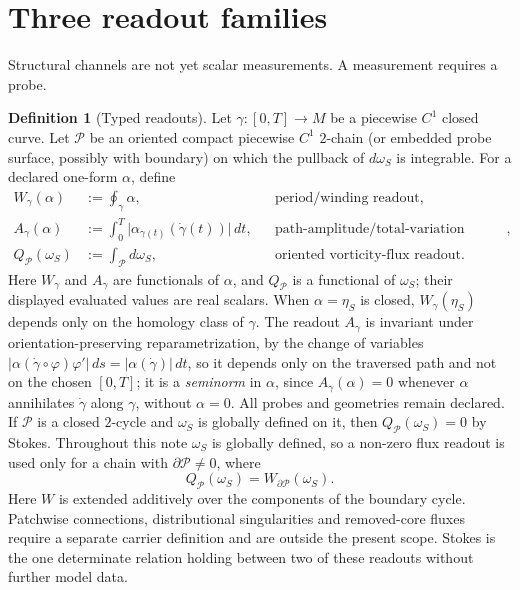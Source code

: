 \documentclass[11pt]{article}
\theoremstyle{definition}
\newtheorem{definition}[theorem]{Definition}
\begin{document}
\section{Three readout families}

Structural channels are not yet scalar measurements.  A measurement
requires a probe.

\begin{definition}[Typed readouts]\label{def:readouts}
Let \(\gamma:[0,T]\to M\) be a piecewise \(C^1\) closed curve.  Let
\(\mathcal P\) be an oriented compact piecewise \(C^1\) \(2\)-chain
(or embedded probe surface, possibly with boundary) on which the
pullback of \(d\omega_S\) is integrable.  For a declared one-form
\(\alpha\), define
\begin{align}
W_\gamma(\alpha)
  &:=\oint_\gamma\alpha,
  &&\text{period/winding readout},\label{eq:period}\\
A_\gamma(\alpha)
  &:=\int_0^T
       \bigl|\alpha_{\gamma(t)}(\dot\gamma(t))\bigr|\,dt,
  &&\text{path-amplitude/total-variation readout},\label{eq:norm}\\
Q_{\mathcal P}(\omega_S)
  &:=\int_{\mathcal P}d\omega_S,
  &&\text{oriented vorticity-flux readout}.\label{eq:flux}
\end{align}
Here \(W_\gamma\) and \(A_\gamma\) are functionals of \(\alpha\), and
\(Q_{\mathcal P}\) is a functional of \(\omega_S\); their displayed
evaluated values are real scalars.  When \(\alpha=\eta_S\) is closed,
\(W_\gamma(\eta_S)\) depends only on the homology class of \(\gamma\).
The readout \(A_\gamma\) is invariant under orientation-preserving
reparametrization, by the change of variables
\(|\alpha(\dot\gamma\circ\varphi)\varphi'|\,ds=|\alpha(\dot\gamma)|\,dt\),
so it depends only on the traversed path and not on the chosen
\([0,T]\); it is a \emph{seminorm} in \(\alpha\), since
\(A_\gamma(\alpha)=0\) whenever \(\alpha\) annihilates \(\dot\gamma\)
along \(\gamma\), without \(\alpha=0\).
All probes and geometries remain declared.  If \(\mathcal P\) is a
closed \(2\)-cycle and \(\omega_S\) is globally defined on it, then
\(Q_{\mathcal P}(\omega_S)=0\) by Stokes.  Throughout this note
\(\omega_S\) is globally defined, so a non-zero flux readout is used only
for a chain with \(\partial\mathcal P\neq0\), where
\[
Q_{\mathcal P}(\omega_S)=W_{\partial\mathcal P}(\omega_S).
\]
Here \(W\) is extended additively over the components of the boundary
cycle.  Patchwise connections, distributional singularities and removed-core
fluxes require a separate carrier definition and are outside the present
scope.  Stokes is the one determinate relation holding between two of these
readouts without further model data.
\end{definition}
\end{document}
